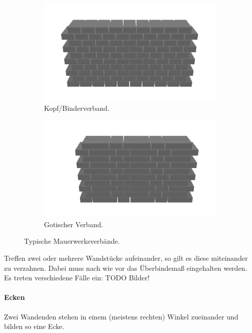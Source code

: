 \begin{figure}[htb]
  \begin{subfigure}[b]{0.5\columnwidth}
    \includegraphics[width=\columnwidth]{fig/kopfverband.png}
    \caption{Kopf/Binderverband.}
    \label{fig:basics:binderverband}
  \end{subfigure}
  \begin{subfigure}[b]{0.5\columnwidth}
    \includegraphics[width=\columnwidth]{fig/gotischerverband.png}
    \caption{Gotischer Verband.}
    \label{fig:basics:gotischer_verband}
  \end{subfigure}
  \label{fig:verbaende}
  \caption{Typische Mauerwerksverbände.}
\end{figure}

Treffen zwei oder mehrere Wandstücke aufeinander, so gilt es diese miteinander zu verzahnen.
Dabei muss nach wie vor das Überbindemaß eingehalten werden.
Es treten verschiedene Fälle ein: TODO Bilder!
\paragraph{Ecken}
Zwei Wandenden stehen in einem (meistens rechten) Winkel zueinander und bilden so eine Ecke.
